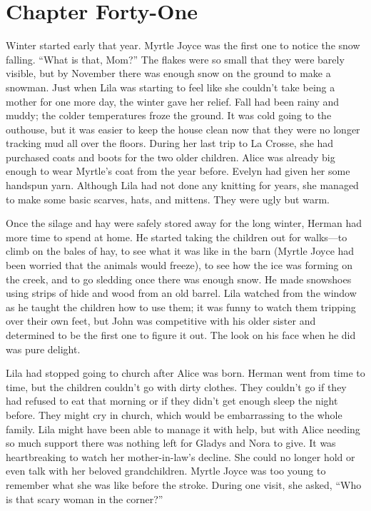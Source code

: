 \documentclass[
  american,
  letterpaper,
]{book}
\begin{document}

\chapter{Chapter Forty-One}\label{chapter-forty-one}

Winter started early that year. Myrtle Joyce was the first one to notice
the snow falling. ``What is that, Mom?'' The flakes were so small that
they were barely visible, but by November there was enough snow on the
ground to make a snowman. Just when Lila was starting to feel like she
couldn't take being a mother for one more day, the winter gave her
relief. Fall had been rainy and muddy; the colder temperatures froze the
ground. It was cold going to the outhouse, but it was easier to keep the
house clean now that they were no longer tracking mud all over the
floors. During her last trip to La Crosse, she had purchased coats and
boots for the two older children. Alice was already big enough to wear
Myrtle's coat from the year before. Evelyn had given her some handspun
yarn. Although Lila had not done any knitting for years, she managed to
make some basic scarves, hats, and mittens. They were ugly but warm.

Once the silage and hay were safely stored away for the long winter,
Herman had more time to spend at home. He started taking the children
out for walks---to climb on the bales of hay, to see what it was like in
the barn (Myrtle Joyce had been worried that the animals would freeze),
to see how the ice was forming on the creek, and to go sledding once
there was enough snow. He made snowshoes using strips of hide and wood
from an old barrel. Lila watched from the window as he taught the
children how to use them; it was funny to watch them tripping over their
own feet, but John was competitive with his older sister and determined
to be the first one to figure it out. The look on his face when he did
was pure delight.

Lila had stopped going to church after Alice was born. Herman went from
time to time, but the children couldn't go with dirty clothes. They
couldn't go if they had refused to eat that morning or if they didn't
get enough sleep the night before. They might cry in church, which would
be embarrassing to the whole family. Lila might have been able to manage
it with help, but with Alice needing so much support there was nothing
left for Gladys and Nora to give. It was heartbreaking to watch her
mother-in-law's decline. She could no longer hold or even talk with her
beloved grandchildren. Myrtle Joyce was too young to remember what she
was like before the stroke. During one visit, she asked, ``Who is that
scary woman in the corner?''
\end{document}
